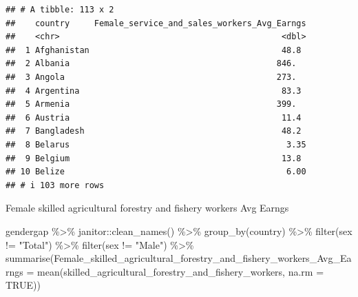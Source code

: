 \documentclass[
]{article}
\newenvironment{Shaded}{\begin{snugshade}}{\end{snugshade}}
\newcommand{\AttributeTok}[1]{\textcolor[rgb]{0.77,0.63,0.00}{#1}}
\newcommand{\ConstantTok}[1]{\textcolor[rgb]{0.00,0.00,0.00}{#1}}
\newcommand{\FunctionTok}[1]{\textcolor[rgb]{0.00,0.00,0.00}{#1}}
\newcommand{\NormalTok}[1]{#1}
\newcommand{\SpecialCharTok}[1]{\textcolor[rgb]{0.00,0.00,0.00}{#1}}
\newcommand{\StringTok}[1]{\textcolor[rgb]{0.31,0.60,0.02}{#1}}
\begin{document}
\begin{verbatim}
## # A tibble: 113 x 2
##    country     Female_service_and_sales_workers_Avg_Earngs
##    <chr>                                             <dbl>
##  1 Afghanistan                                       48.8 
##  2 Albania                                          846.  
##  3 Angola                                           273.  
##  4 Argentina                                         83.3 
##  5 Armenia                                          399.  
##  6 Austria                                           11.4 
##  7 Bangladesh                                        48.2 
##  8 Belarus                                            3.35
##  9 Belgium                                           13.8 
## 10 Belize                                             6.00
## # i 103 more rows
\end{verbatim}

Female skilled agricultural forestry and fishery workers Avg Earngs

\begin{Shaded}
\begin{Highlighting}[]
\NormalTok{gendergap }\SpecialCharTok{\%\textgreater{}\%}
\NormalTok{  janitor}\SpecialCharTok{::}\FunctionTok{clean\_names}\NormalTok{() }\SpecialCharTok{\%\textgreater{}\%}
  \FunctionTok{group\_by}\NormalTok{(country) }\SpecialCharTok{\%\textgreater{}\%} 
   \FunctionTok{filter}\NormalTok{(sex }\SpecialCharTok{!=} \StringTok{"Total"}\NormalTok{) }\SpecialCharTok{\%\textgreater{}\%}
  \FunctionTok{filter}\NormalTok{(sex }\SpecialCharTok{!=} \StringTok{"Male"}\NormalTok{) }\SpecialCharTok{\%\textgreater{}\%}
  \FunctionTok{summarise}\NormalTok{(}\AttributeTok{Female\_skilled\_agricultural\_forestry\_and\_fishery\_workers\_Avg\_Earngs =} \FunctionTok{mean}\NormalTok{(skilled\_agricultural\_forestry\_and\_fishery\_workers, }\AttributeTok{na.rm =} \ConstantTok{TRUE}\NormalTok{))}
\end{Highlighting}
\end{Shaded}
\end{document}
